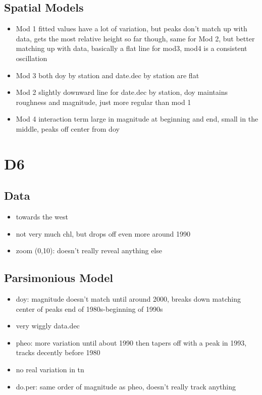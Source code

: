 \documentclass[12pt]{amsart}
\begin{document}
\subsection{Spatial Models}

\begin{itemize}
\item Mod 1 fitted values have a lot of variation, but peaks don't match up with data, gets the most relative height so far though, same for Mod 2, but better matching up with data, basically a flat line for mod3, mod4 is a consistent oscillation
\item Mod 3 both doy by station and date.dec by station are flat
\item Mod 2 slightly downward line for date.dec by station, doy maintains roughness and magnitude, just more regular than mod 1
\item Mod 4 interaction term large in magnitude at beginning and end, small in the middle, peaks off center from doy
\end{itemize}


\section{D6}
\subsection{Data}
\begin{itemize}
\item towards the west
\item not very much chl, but drops off even more around 1990
\item zoom (0,10): doesn't really reveal anything else
\end{itemize}
\subsection{Parsimonious Model}
\begin{itemize}
\item doy: magnitude doesn't match until around 2000, breaks down matching center of peaks end of 1980s-beginning of 1990s
\item very wiggly data.dec
\item pheo: more variation until about 1990 then tapers off with a peak in 1993, tracks decently before 1980
\item no real variation in tn
\item do.per: same order of magnitude as pheo, doesn't really track anything
\end{itemize}
\end{document}
